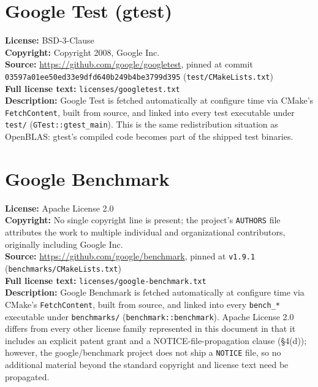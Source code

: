 \documentclass[11pt]{article}
\newcommand{\field}[2]{\noindent\textbf{#1:} #2\\}
\begin{document}
\section{Google Test (gtest)}

\field{License}{BSD-3-Clause}
\field{Copyright}{Copyright 2008, Google Inc.}
\field{Source}{\url{https://github.com/google/googletest}, pinned at commit \texttt{03597a01ee50ed33e9dfd640b249b4be3799d395} (\texttt{test/CMakeLists.txt})}
\field{Full license text}{\texttt{licenses/googletest.txt}}

\noindent
\textbf{Description:} Google Test is fetched automatically at configure
time via CMake's \texttt{FetchContent}, built from source, and linked into
every test executable under \texttt{test/} (\texttt{GTest::gtest\_main}).
This is the same redistribution situation as OpenBLAS: gtest's compiled
code becomes part of the shipped test binaries.

\section{Google Benchmark}

\field{License}{Apache License 2.0}
\field{Copyright}{No single copyright line is present; the project's \texttt{AUTHORS} file attributes the work to multiple individual and organizational contributors, originally including Google Inc.}
\field{Source}{\url{https://github.com/google/benchmark}, pinned at \texttt{v1.9.1} (\texttt{benchmarks/CMakeLists.txt})}
\field{Full license text}{\texttt{licenses/google-benchmark.txt}}

\noindent
\textbf{Description:} Google Benchmark is fetched automatically at
configure time via CMake's \texttt{FetchContent}, built from source, and
linked into every \texttt{bench\_*} executable under \texttt{benchmarks/}
(\texttt{benchmark::benchmark}). Apache License 2.0 differs from every
other license family represented in this document in that it includes an
explicit patent grant and a NOTICE-file-propagation clause (\S4(d));
however, the google/benchmark project does not ship a \texttt{NOTICE}
file, so no additional material beyond the standard copyright and license
text need be propagated.
\end{document}
